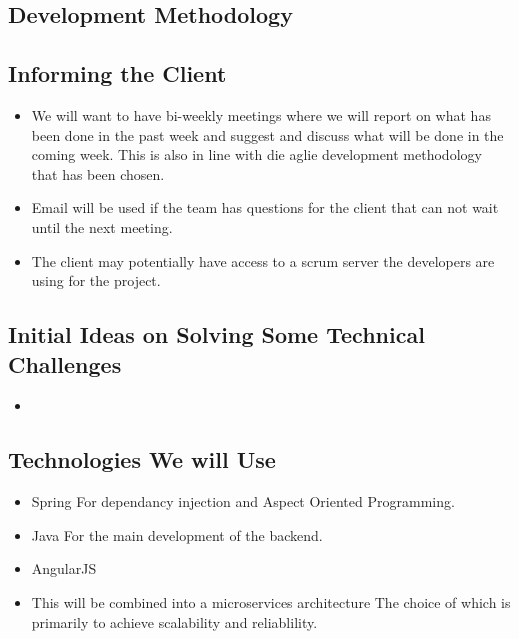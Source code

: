 \subsection{Development Methodology}


\subsection{Informing the Client}
\begin{itemize}
	\item We will want to have bi-weekly meetings where we will report on what has been done in the past week and suggest and discuss what will be done in the coming week. This is also in line with die aglie development methodology that has been chosen.
	\item Email will be used if the team has questions for the client that can not wait until the next meeting.
	\item The client may potentially have access to a scrum server the developers are using for the project.
\end{itemize}

\subsection{Initial Ideas on Solving Some Technical Challenges}
\begin{itemize}
	\item 
\end{itemize}

\subsection{Technologies We will Use}
\begin{itemize}
	\item Spring
	For dependancy injection and Aspect Oriented Programming.
	\item Java
	For the main development of the backend.
	\item AngularJS
	\item This will be combined into a microservices architecture
	The choice of which is primarily to achieve scalability and reliablility.
\end{itemize} 

